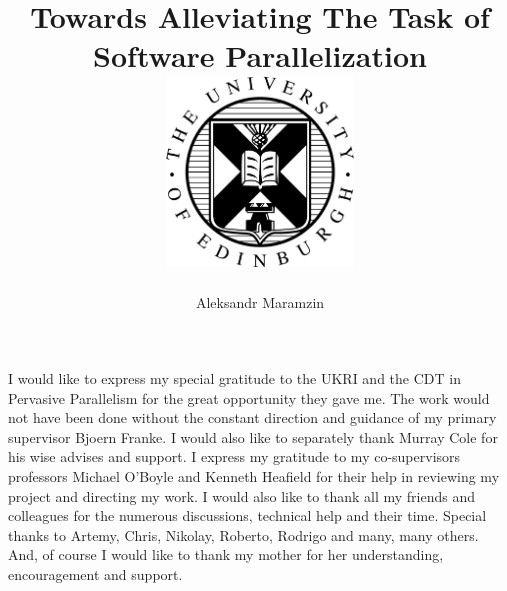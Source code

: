 \documentclass[mphil,icsa,twoside]{infthesis}
\title{
{Towards Alleviating The Task of Software Parallelization}\\
{\includegraphics[width=50mm,scale=0.5]{eushield-normal.pdf}}
}
\author{Aleksandr Maramzin}
\begin{document}
\begin{preliminary}

\maketitle

\begin{acknowledgements}
\quad I would like to express my special gratitude to the UKRI and the CDT in Pervasive Parallelism for the great opportunity they gave me. The work would not have been done without the constant direction and guidance of my primary supervisor Bjoern Franke. I would also like to separately thank Murray Cole for his wise advises and support. I express my gratitude to my co-supervisors professors Michael O'Boyle and Kenneth Heafield for their help in reviewing my project and directing my work. I would also like to thank all my friends and colleagues for the numerous discussions, technical help and their time. Special thanks to Artemy, Chris, Nikolay, Roberto, Rodrigo and many, many others. And, of course I would like to thank my mother for her understanding, encouragement and support.
\end{acknowledgements}

\standarddeclaration


\tableofcontents


\end{preliminary}



% 









\appendix







\printbibliography

\end{document}
